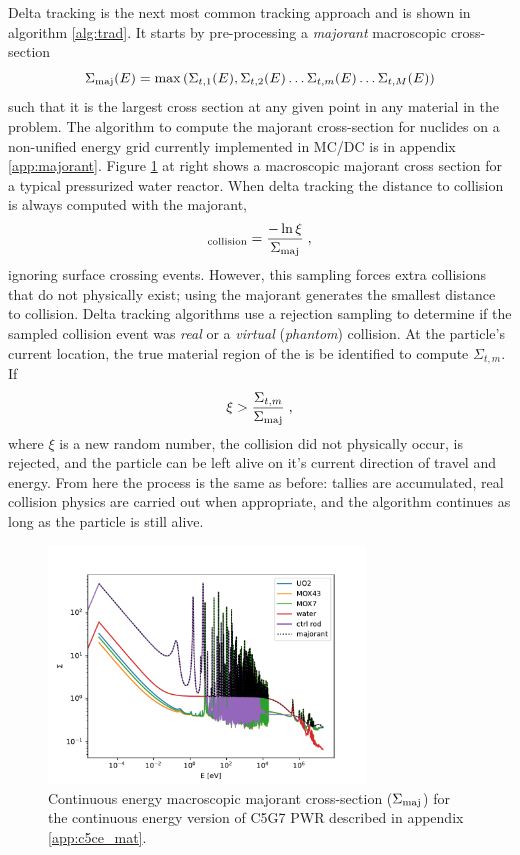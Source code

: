 Delta tracking is the next most common tracking approach and is shown in algorithm \ref{alg:trad}.
It starts by pre-processing a \textit{majorant} macroscopic cross-section
\begin{equation}
    \Sigma_{\text{maj}}(E) = \max\left({\Sigma_{t,1}(E), \Sigma_{t,2}(E) \dots \Sigma_{t,m}(E) \dots \Sigma_{t,M}(E)}\right)
\end{equation}
such that it is the largest cross section at any given point in any material in the problem.
The algorithm to compute the majorant cross-section for nuclides on a non-unified energy grid currently implemented in MC/DC is in appendix \ref{app:majorant}.
Figure \ref{fig:majorant_c5ce} at right shows a macroscopic majorant cross section for a typical pressurized water reactor.
When delta tracking the distance to collision is always computed with the majorant,
\begin{equation}
    _{\text{collision}} = \frac{-\ln{\xi}}{\Sigma_{\text{maj}}} \; ,
\end{equation}
ignoring surface crossing events.
However, this sampling forces extra collisions that do not physically exist; using the majorant generates the smallest distance to collision. Delta tracking algorithms use a rejection sampling to determine if the sampled collision event was \textit{real} or a \textit{virtual} (\textit{phantom}) collision.
At the particle's current location, the true material region of the is be identified to compute $\Sigma_{t,m}$.
If 
\begin{equation}
    \xi > \frac{\Sigma_{t,m}}{\Sigma_{\text{maj}}} \; ,
\end{equation}
where $\xi$ is a new random number, the collision did not physically occur, is rejected, and the particle can be left alive on it's current direction of travel and energy.
From here the process is the same as before: tallies are accumulated, real collision physics are carried out when appropriate, and the algorithm continues as long as the particle is still alive.

\begin{figure}
    \centering
    \includegraphics[width=0.75\textwidth]{monte_carlo/delta_tracking/figures/macro_majorant_c5ce.pdf}
    \caption{Continuous energy macroscopic majorant cross-section ($\Sigma_{\text{maj}}$) for the continuous energy version of C5G7 PWR described in appendix \ref{app:c5ce_mat}.}
    \label{fig:majorant_c5ce}
\end{figure}

